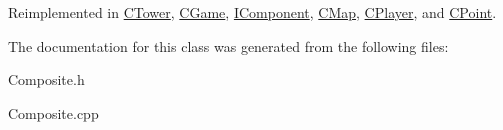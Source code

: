 Reimplemented in \hyperlink{classCTower_a90009dda4be1e5e20d37a57dc8aa068b}{C\+Tower}, \hyperlink{classCGame_a7fd9071f64f9f8593ba7ef97e52747b0}{C\+Game}, \hyperlink{classIComponent_a12217e57a33f8978af5610511eaddad5}{I\+Component}, \hyperlink{classCMap_a531e772146ef58a62e1b835909e5b2e0}{C\+Map}, \hyperlink{classCPlayer_aeca038d0b0e8a7e8a6920dc066a2a22d}{C\+Player}, and \hyperlink{classCPoint_a9be3f2b4e3445a55ab8af9fd835a1c97}{C\+Point}.



The documentation for this class was generated from the following files\+:\begin{DoxyCompactItemize}
\item 
Composite.\+h\item 
Composite.\+cpp\end{DoxyCompactItemize}
